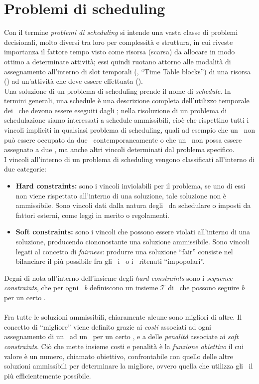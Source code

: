 \section{Problemi di scheduling}
Con il termine \textit{problemi di scheduling} si intende una vasta classe di problemi decisionali, molto diversi tra loro per
complessità e struttura, in cui riveste importanza il fattore
tempo visto come risorsa (scarsa) da allocare in modo ottimo a determinate attività; essi quindi ruotano attorno alle modalità di assegnamento all'interno di slot temporali (\ttb, ``Time Table blocks'') di una risorsa (\task) ad un'attività che deve essere effettuata (\items). \\
Una soluzione di un problema di scheduling prende il nome di \textit{schedule}. In termini generali,
una schedule è una descrizione completa dell'utilizzo temporale dei \task\ che devono essere eseguiti dagli \items; nella risoluzione di un problema di schedulazione siamo interessati a schedule ammissibili, cioè che rispettino tutti i vincoli impliciti in qualsiasi problema di scheduling, quali ad esempio che un \task\ non può essere occupato da due \items\ contemporaneamente o che un \items\ non possa essere assegnato a due \task, ma anche altri vincoli determinati dal problema specifico. \\
I vincoli all'interno di un problema di scheduling vengono classificati all'interno di due categorie:
\begin{itemize}
    \item \textbf{Hard constraints:} sono i vincoli inviolabili per il problema, se uno di essi non viene rispettato all'interno di una soluzione, tale soluzione non è ammissibile. Sono vincoli dati dalla natura degli \items\ da schedulare o imposti da fattori esterni, come leggi in merito o regolamenti.
    \item \textbf{Soft constraints:} sono i vincoli che possono essere violati all'interno di una soluzione, producendo ciononostante una soluzione ammissibile. Sono vincoli legati al concetto di \textit{fairness}: produrre una soluzione ``fair'' consiste nel bilanciare il più possibile fra gli \items\ i \task\ o i \ttb\ ritenuti ``impopolari''.
\end{itemize}
Degni di nota all'interno dell'insieme degli \textit{hard constraints} sono i \textit{sequence constraints}, che per ogni \ttb\ \textit{b} definiscono un insieme $\mathcal{T}$ di \ttb\ che possono seguire \textit{b} per un certo \items. \\ \\
\noindent
Fra tutte le soluzioni ammissibili, chiaramente alcune sono migliori di altre. Il concetto di ``migliore'' viene definito grazie ai \textit{costi} associati ad ogni assegnamento di un \items\ ad un \task\ per un certo \ttb, e a delle \textit{penalità} associate ai \textit{soft constraints}. Ciò che mette insieme costi e penalità è la \textit{funzione obiettivo} il cui valore è un numero, chiamato obiettivo, confrontabile con quello delle altre soluzioni ammissibili per determinare la migliore, ovvero quella che utilizza gli \items\ il più efficientemente possibile.
